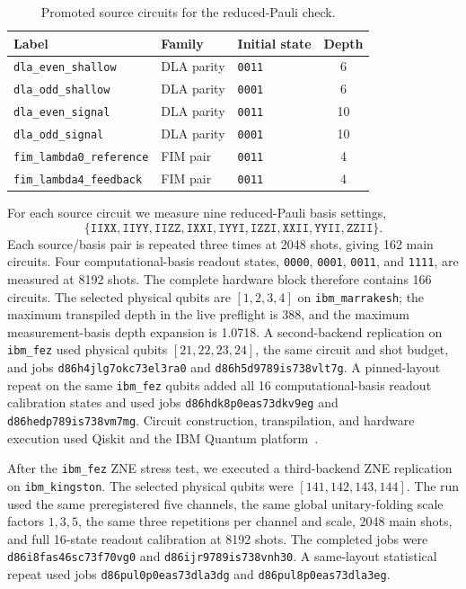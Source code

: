 \documentclass[preprint,aps,physrev,superscriptaddress,floatfix,longbibliography]{revtex4-2}
\begin{document}
\begin{table}[tb]
\centering
\begin{tabular}{lllc}
\toprule
Label & Family & Initial state & Depth \\
\midrule
\texttt{dla\_even\_shallow} & DLA parity & \texttt{0011} & 6 \\
\texttt{dla\_odd\_shallow} & DLA parity & \texttt{0001} & 6 \\
\texttt{dla\_even\_signal} & DLA parity & \texttt{0011} & 10 \\
\texttt{dla\_odd\_signal} & DLA parity & \texttt{0001} & 10 \\
\texttt{fim\_lambda0\_reference} & FIM pair & \texttt{0011} & 4 \\
\texttt{fim\_lambda4\_feedback} & FIM pair & \texttt{0011} & 4 \\
\bottomrule
\end{tabular}
\caption{Promoted source circuits for the reduced-Pauli check.}
\label{tab:sources}
\end{table}

For each source circuit we measure nine reduced-Pauli basis settings,
\begin{equation}
\{\texttt{IIXX},\texttt{IIYY},\texttt{IIZZ},\texttt{IXXI},\texttt{IYYI},
\texttt{IZZI},\texttt{XXII},\texttt{YYII},\texttt{ZZII}\}.
\end{equation}
Each source/basis pair is repeated three times at 2048 shots, giving 162 main
circuits. Four computational-basis readout states, \texttt{0000},
\texttt{0001}, \texttt{0011}, and \texttt{1111}, are measured at 8192 shots.
The complete hardware block therefore contains 166 circuits. The selected
physical qubits are $[1,2,3,4]$ on \texttt{ibm\_marrakesh}; the maximum
transpiled depth in the live preflight is 388, and the maximum
measurement-basis depth expansion is 1.0718. A second-backend replication on
\texttt{ibm\_fez} used physical qubits $[21,22,23,24]$, the same circuit and
shot budget, and jobs \texttt{d86h4jlg7okc73el3ra0} and
\texttt{d86h5d9789is738vlt7g}. A pinned-layout repeat on the same
\texttt{ibm\_fez} qubits added all 16 computational-basis readout calibration
states and used jobs \texttt{d86hdk8p0eas73dkv9eg} and
\texttt{d86hedp789is738vm7mg}. Circuit construction, transpilation, and
hardware execution used Qiskit and the IBM Quantum
platform~\cite{Qiskit2024,IBMQuantum}.

After the \texttt{ibm\_fez} ZNE stress test, we executed a third-backend ZNE
replication on \texttt{ibm\_kingston}. The selected physical qubits were
$[141,142,143,144]$. The run used the same preregistered five channels, the
same global unitary-folding scale factors $1,3,5$, the same three repetitions
per channel and scale, 2048 main shots, and full 16-state readout calibration
at 8192 shots. The completed jobs were \texttt{d86i8fas46sc73f70vg0} and
\texttt{d86ijr9789is738vnh30}. A same-layout statistical repeat used jobs
\texttt{d86pul0p0eas73dla3dg} and \texttt{d86pul8p0eas73dla3eg}.
\end{document}
